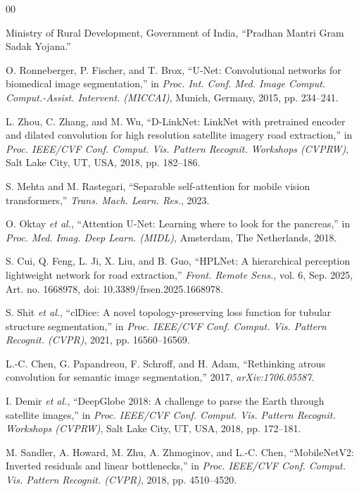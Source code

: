 \documentclass{ieeeaccess}
\begin{document}
\begin{thebibliography}{00}

Ministry of Rural Development, Government of India,
``Pradhan Mantri Gram Sadak Yojana.''

O. Ronneberger, P. Fischer, and T. Brox,
``U-Net: Convolutional networks for biomedical image segmentation,''
in \emph{Proc. Int. Conf. Med. Image Comput. Comput.-Assist. Intervent. (MICCAI)},
Munich, Germany, 2015, pp. 234--241.

L. Zhou, C. Zhang, and M. Wu,
``D-LinkNet: LinkNet with pretrained encoder and dilated convolution for high resolution satellite imagery road extraction,''
in \emph{Proc. IEEE/CVF Conf. Comput. Vis. Pattern Recognit. Workshops (CVPRW)},
Salt Lake City, UT, USA, 2018, pp. 182--186.

S. Mehta and M. Rastegari,
``Separable self-attention for mobile vision transformers,''
\emph{Trans. Mach. Learn. Res.}, 2023.

O. Oktay \emph{et al.},
``Attention U-Net: Learning where to look for the pancreas,''
in \emph{Proc. Med. Imag. Deep Learn. (MIDL)},
Amsterdam, The Netherlands, 2018.

S. Cui, Q. Feng, L. Ji, X. Liu, and B. Guo,
``HPLNet: A hierarchical perception lightweight network for road extraction,''
\emph{Front. Remote Sens.}, vol. 6, Sep. 2025, Art. no. 1668978,
doi: 10.3389/frsen.2025.1668978.

S. Shit \emph{et al.},
``clDice: A novel topology-preserving loss function for tubular structure segmentation,''
in \emph{Proc. IEEE/CVF Conf. Comput. Vis. Pattern Recognit. (CVPR)},
2021, pp. 16560--16569.

L.-C. Chen, G. Papandreou, F. Schroff, and H. Adam,
``Rethinking atrous convolution for semantic image segmentation,''
2017, \emph{arXiv:1706.05587}.

I. Demir \emph{et al.},
``DeepGlobe 2018: A challenge to parse the Earth through satellite images,''
in \emph{Proc. IEEE/CVF Conf. Comput. Vis. Pattern Recognit. Workshops (CVPRW)},
Salt Lake City, UT, USA, 2018, pp. 172--181.

M. Sandler, A. Howard, M. Zhu, A. Zhmoginov, and L.-C. Chen,
``MobileNetV2: Inverted residuals and linear bottlenecks,''
in \emph{Proc. IEEE/CVF Conf. Comput. Vis. Pattern Recognit. (CVPR)},
2018, pp. 4510--4520.


\end{thebibliography}
\end{document}
